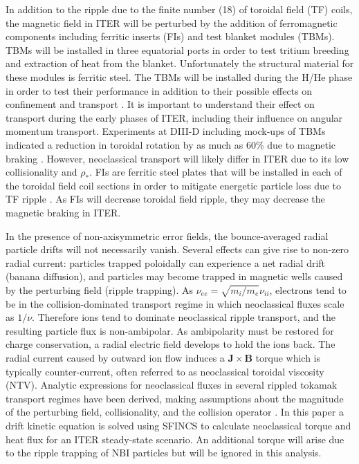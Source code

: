 \documentclass{article}
\begin{document}
In addition to the ripple due to the finite number (18) of toroidal field (TF) coils, the magnetic field in ITER will be perturbed by the addition of ferromagnetic components including ferritic inserts (FIs) and test blanket modules (TBMs). TBMs will be installed in three equatorial ports in order to test tritium breeding and extraction of heat from the blanket. Unfortunately the structural material for these modules is ferritic steel. The TBMs will be installed during the H/He phase in order to test their performance in addition to their possible effects on confinement and transport \cite{Chuyanov2010}. It is important to understand their effect on transport during the early phases of ITER, including their influence on angular momentum transport. Experiments at DIII-D including mock-ups of TBMs indicated a reduction in toroidal rotation by as much as 60\% due to magnetic braking \cite{Schaffer2011}. However, neoclassical transport will likely differ in ITER due to its low collisionality and $\rho_*$. FIs are ferritic steel plates that will be installed in each of the toroidal field coil sections in order to mitigate energetic particle loss due to TF ripple \cite{Tobita2003}. As FIs will decrease toroidal field ripple, they may decrease the magnetic braking in ITER. 

In the presence of non-axisymmetric error fields, the bounce-averaged radial particle drifts will not necessarily vanish. Several effects can give rise to non-zero radial current: particles trapped poloidally can experience a net radial drift (banana diffusion), and particles may become trapped in magnetic wells caused by the perturbing field (ripple trapping). As $\nu_{ee} = \sqrt{m_i/m_e} \nu_{ii}$, electrons tend to be in the collision-dominated transport regime in which neoclassical fluxes scale as $1/\nu$.  Therefore ions tend to dominate neoclassical ripple transport, and the resulting particle flux is non-ambipolar. As ambipolarity must be restored for charge conservation, a radial electric field develops to hold the ions back. The radial current caused by outward ion flow induces a $\bm{J} \times \bm{B}$ torque which is typically counter-current, often referred to as neoclassical toroidal viscosity (NTV). Analytic expressions for neoclassical fluxes in several rippled tokamak transport regimes have been derived, making assumptions about the magnitude of the perturbing field, collisionality, and the collision operator \cite{Shaing2003, Shaing2008, Shaing2010}. In this paper a drift kinetic equation is solved using SFINCS \cite{Landreman2014} to calculate neoclassical torque and heat flux for an ITER steady-state scenario. An additional torque will arise due to the ripple trapping of NBI particles but will be ignored in this analysis. 
\end{document}
